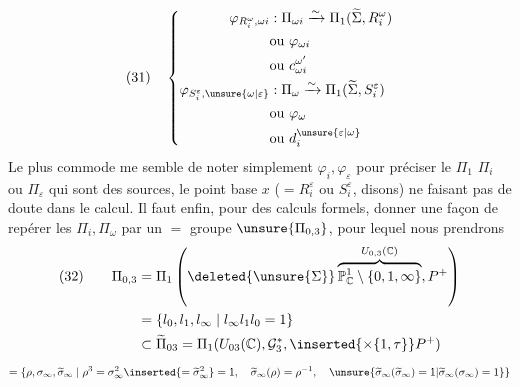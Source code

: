 \[
(31)\quad\left\{\begin{aligned}
\varphi_{R_i^\omega,\omega i}&:\Pi_{\omega i}\xrightarrow{\sim}\Pi_1(\widetilde\Sigma,R_i^\omega)\\
&\text{ou }\varphi_{\omega i}\\
&\text{ou }c_{\omega i}^{\omega'}\\
\varphi_{S_i^\varepsilon,\unsure{\omega|\varepsilon}}&:\Pi_\omega\xrightarrow{\sim}\Pi_1(\widetilde\Sigma,S_i^\varepsilon)\\
&\text{ou }\varphi_\omega\\
&\text{ou }d_i^{\unsure{\varepsilon|\omega}}
\end{aligned}\right.
\]
Le plus commode me semble de noter simplement $\varphi_i,\varphi_\varepsilon$ pour préciser le  $\Pi_1$  $\Pi_i$ ou $\Pi_\varepsilon$ qui sont des sources, le point base $x$ ($=R_i^\varepsilon$ ou $S_i^\varepsilon$, disons) ne faisant pas de doute dans le calcul.
Il faut enfin, pour des calculs formels, donner une façon de repérer les $\Pi_i,\Pi_\omega$ par un $=$ groupe  $\unsure{\Pi_{0,3}}$, pour lequel nous prendrons
\[
\begin{aligned}
(32)\qquad\Pi_{0,3}&=\Pi_1\left(\deleted{\unsure{\Sigma}}\overbrace{\mathbb P^1_{\mathbb C}\setminus\{0,1,\infty\}}^{U_{0,3}(\mathbb C)},P^+\right)\\
&=\{l_0,l_1,l_\infty\mid l_\infty l_1l_0=1\}\\
&\subset\widetilde\Pi_{03}=\Pi_1(U_{03}(\mathbb C),\mathcal G_3^*,\inserted{\times\{1,\tau\}}P^+)
\end{aligned}
\]
\[
=\{\rho,\sigma_\infty,\widetilde\sigma_\infty\mid \rho^3=\sigma_\infty^2\inserted{=\widetilde\sigma_\infty^2}=1,\quad \widetilde\sigma_\infty(\rho)=\rho^{-1},\quad\unsure{\widetilde\sigma_\infty(\widetilde\sigma_\infty)=1|\widetilde\sigma_\infty(\sigma_\infty)=1}\}
\]
